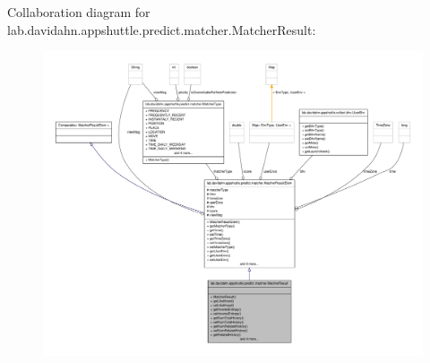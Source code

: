 \-Collaboration diagram for lab.\-davidahn.\-appshuttle.\-predict.\-matcher.\-Matcher\-Result\-:
\nopagebreak
\begin{figure}[H]
\begin{center}
\leavevmode
\includegraphics[width=350pt]{classlab_1_1davidahn_1_1appshuttle_1_1predict_1_1matcher_1_1_matcher_result__coll__graph}
\end{center}
\end{figure}
